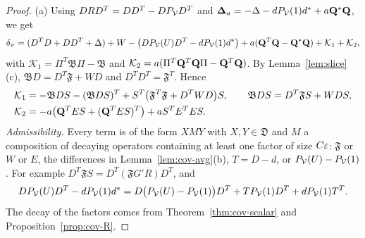 \begin{proof}
(a) Using $DRD^T=DD^T-DP_\mathcal V D^T$ and $\boldsymbol{\Delta}_a=-\Delta-dP_\mathcal V(1)d^*+a\mathbf Q^*\mathbf Q$, we get
\[
\delta_\pi=(D^TD+DD^T+\Delta)+W-\big(DP_\mathcal V(U)D^T-dP_\mathcal V(1)d^*\big)+a(\mathbf Q^T\mathbf Q-\mathbf Q^*\mathbf Q)+\mathcal K_1+\mathcal K_2,
\]
with $\mathcal K_1=\Pi^T\mathfrak B\Pi-\mathfrak B$ and $\mathcal K_2=a(\Pi^T\mathbf Q^T\mathbf Q\Pi-\mathbf Q^T\mathbf Q)$. By Lemma~\ref{lem:slice}(c), $\mathfrak BD=D^T\mathfrak F+WD$ and $D^TD^T=\mathfrak F^T$. Hence
\begin{align*}
\mathcal K_1&=-\mathfrak BDS-(\mathfrak BDS)^T+S^T\big(\mathfrak F^T\mathfrak F+D^TWD\big)S,\qquad \mathfrak BDS=D^T\mathfrak FS+WDS,\\
\mathcal K_2&=-a\big(\mathbf Q^TES+(\mathbf Q^TES)^T\big)+aS^TE^TES .
\end{align*}
\emph{Admissibility.} Every term is of the form $X M Y$ with $X,Y\in\mathfrak D$ and $M$ a composition of decaying operators containing at least one factor of size $C\varepsilon$: $\mathfrak F$ or $W$ or $E$, the differences in Lemma~\ref{lem:cov-avg}(b), $T=D-d$, or $P_\mathcal V(U)-P_\mathcal V(1)$. For example $D^T\mathfrak FS=D^T(\mathfrak FG'R)D^T$, and
\[
DP_\mathcal V(U)D^T-dP_\mathcal V(1)d^*=D\big(P_\mathcal V(U)-P_\mathcal V(1)\big)D^T+TP_\mathcal V(1)D^T+dP_\mathcal V(1)T^T .
\]
The decay of the factors comes from Theorem~\ref{thm:cov-scalar} and Proposition~\ref{prop:cov-R}.


\end{proof}
